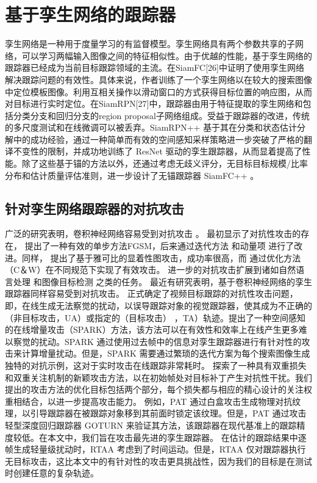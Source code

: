\section{基于孪生网络的跟踪器}
孪生网络是一种用于度量学习的有监督模型。孪生网络具有两个参数共享的子网络，可以学习两幅输入图像之间的特征相似性。由于优越的性能，基于孪生网络的跟踪器已经成为当前目标跟踪领域的主流。在SiamFC[26]中证明了使用孪生网络解决跟踪问题的有效性。具体来说，作者训练了一个孪生网络以在较大的搜索图像中定位模板图像。利用互相关操作以滑动窗口的方式获得目标位置的响应图，从而对目标进行实时定位。在SiamRPN[27]中，跟踪器由用于特征提取的孪生网络和包括分类分支和回归分支的region proposal子网络组成。受益于跟踪器的改进，传统的多尺度测试和在线微调可以被丢弃。SiamRPN++ \cite{SiamRPN++} 基于其在分类和状态估计分解中的成功经验，通过一种简单而有效的空间感知采样策略进一步突破了严格的翻译不变性的限制，并成功地训练了 ResNet 驱动的孪生跟踪器，从而显着提高了性能。除了这些基于锚的方法以外，还通过考虑无歧义评分，无目标目标规模/比率分布和估计质量评估准则，进一步设计了无锚跟踪器 SiamFC++ \cite{SiamFC++}。
\subsection{针对孪生网络跟踪器的对抗攻击}
广泛的研究表明，卷积神经网络容易受到对抗攻击 \cite{Deepsec}。\cite{intriguing} 最初显示了对抗性攻击的存在，\cite{FGSM} 提出了一种有效的单步方法FGSM，后来通过迭代方法 \cite{kurakin2017adversarial} 和动量项 \cite{dong2018boosting} 进行了改进。同样，\cite{papernot2016limitations} 提出了基于雅可比的显着性图攻击，成功率很高，而 \cite{carlini2017towards} 通过优化方法（C＆W）在不同规范下实现了有效攻击。 进一步的对抗攻击扩展到诸如自然语言处理 \cite{generating} 和图像目标检测 \cite{wei2019transferable}之类的任务。
最近有研究表明，基于卷积神经网络的孪生跟踪器同样容易受到对抗攻击。\cite{SPARK} 正式确定了视频目标跟踪的对抗性攻击问题，即，在线生成无法察觉的扰动，以误导跟踪对象的视觉跟踪器，使其成为不正确的（非目标攻击，UA）或指定的（目标攻击） ，TA）轨迹。提出了一种空间感知的在线增量攻击（SPARK）方法，该方法可以在有效性和效率上在线产生更多难以察觉的扰动。SPARK \cite{SPARK} 通过使用过去帧中的信息对孪生跟踪器进行有针对性的攻击来计算增量扰动。但是，SPARK 需要通过繁琐的迭代方案为每个搜索图像生成独特的对抗示例，这对于实时攻击在线跟踪非常耗时。\cite{chen2020one} 探索了一种具有双重损失和双重关注机制的新颖攻击方法，以在初始帧处对目标补丁产生对抗性干扰。我们提出的攻击方法的优化目标包括两个部分，每个损失都与相应的精心设计的关注权重相结合，以进一步提高攻击能力。
例如，PAT \cite{PAT} 通过白盒攻击生成物理对抗纹理，以引导跟踪器在被跟踪对象移到其前面时锁定该纹理。但是，PAT 通过攻击轻型深度回归跟踪器 GOTURN \cite{GOTURN} 来验证其方法，该跟踪器在现代基准上的跟踪精度较低。在本文中，我们旨在攻击最先进的孪生跟踪器。
在估计的跟踪结果中逐帧生成轻量级扰动时，RTAA \cite{RTAA} 考虑到了时间运动。但是，RTAA 仅对跟踪器执行无目标攻击，这比本文中的有针对性的攻击更具挑战性，因为我们的目标是在测试时创建任意的复杂轨迹。

